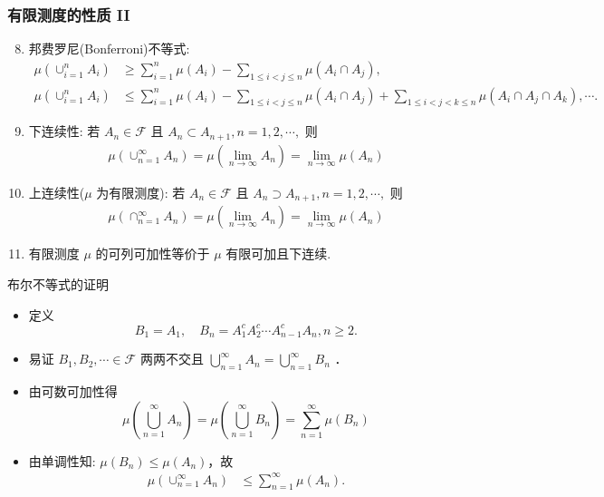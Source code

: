 \documentclass[Prob-All.tex]{subfiles}
\begin{document}
\begin{frame}
	\frametitle{有限测度的性质 II}

	\begin{enumerate}[<+-|alert@+>]
		\setcounter{enumi}{7}
		\item 邦费罗尼(Bonferroni)不等式:
		{\small \begin{align*}
			\mu(\cup_{i=1}^{n} A_{i}) &\geq \sum_{i=1}^{n} \mu(A_{i})-\sum_{1\leq i<j\leq n} \mu(A_{i} \cap A_{j}), \\
			\mu(\cup_{i=1}^nA_i)&\leq \sum_{i=1}^{n} \mu(A_{i})-\sum_{1\leq i<j\leq n} \mu(A_{i} \cap A_{j})+\sum_{1\leq i<j<k\leq n}\mu(A_i\cap A_j\cap A_k), \cdots.
		\end{align*}}
		\item 下连续性:
		      若 $A_n\in\mathcal{F}$ 且 $A_n\subset A_{n+1}, n=1,2,\cdots,$ 则
		      \begin{eqnarray*}
			      \mu(\cup_{n=1}^\infty A_n)=\mu(\lim_{n\rightarrow\infty}A_n)=\lim_{n\rightarrow\infty}\mu(A_n)
		      \end{eqnarray*}
		\item 上连续性($\mu$ 为有限测度):
		      若 $A_n\in\mathcal{F}$ 且 $A_n\supset A_{n+1}, n=1,2,\cdots,$ 则
		      \begin{eqnarray*}
			      \mu(\cap_{n=1}^\infty A_n)=\mu(\lim_{n\rightarrow\infty}A_n)=\lim_{n\rightarrow\infty}\mu(A_n)
		      \end{eqnarray*}
		\item 有限测度 $\mu$ 的可列可加性等价于 $\mu$ 有限可加且下连续.
	\end{enumerate}

\end{frame}
\begin{frame}{布尔不等式的证明}
\begin{itemize}[<+-|alert@+>]
\item 定义
$$B_{1}=A_{1}, \quad B_{n}=A_{1}^{c} A_{2}^{c} \cdots A_{n-1}^{c} A_{n}, n \geq 2.$$

\item 易证 $B_{1}, B_{2}, \cdots \in \mathcal{F}$ 两两不交且 $\bigcup_{n=1}^{\infty} A_{n}=\bigcup_{n=1}^{\infty} B_{n}$ ．

\item 由可数可加性得
\[
\mu\left(\bigcup_{n=1}^{\infty} A_{n}\right)=\mu\left(\bigcup_{n=1}^{\infty} B_{n}\right)=\sum_{n=1}^{\infty} \mu\left(B_{n}\right)
\]

\item 由单调性知: $\mu\left(B_{n}\right) \leqslant \mu\left(A_{n}\right)$，故
\begin{align*}
\mu(\cup_{n=1}^{\infty}A_n)&\leq \sum_{n=1}^{\infty}\mu(A_n).
\end{align*}
\end{itemize}



\end{frame}
\end{document}
